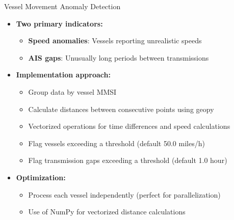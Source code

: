 \documentclass[svgnames, 12pt]{beamer}
\begin{document}
\begin{frame}{Vessel Movement Anomaly Detection}
    \begin{itemize}
        \item \textbf{Two primary indicators:}
        \begin{itemize}
            \item \textbf{Speed anomalies}: Vessels reporting unrealistic speeds
            \item \textbf{AIS gaps}: Unusually long periods between transmissions
        \end{itemize}
        \item \textbf{Implementation approach:}
        \begin{itemize}
            \item Group data by vessel MMSI
            \item Calculate distances between consecutive points using geopy
            \item Vectorized operations for time differences and speed calculations
            \item Flag vessels exceeding a threshold (default 50.0 miles/h)
            \item Flag transmission gaps exceeding a threshold (default 1.0 hour)
        \end{itemize}
        \item \textbf{Optimization:}
        \begin{itemize}
            \item Process each vessel independently (perfect for parallelization)
            \item Use of NumPy for vectorized distance calculations
        \end{itemize}
    \end{itemize}
\end{frame}
\end{document}
